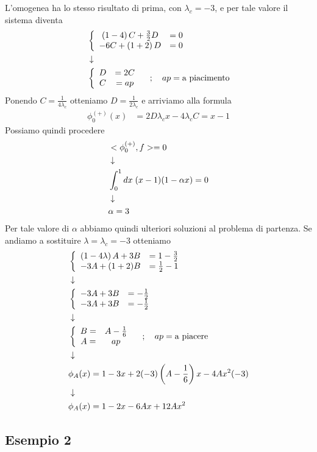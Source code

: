 \begin{enumerate}
	L'omogenea ha lo stesso risultato di prima, con $\lambda_c = -3$, e per tale valore il sistema diventa
	\begin{align}
		&\left\{ \begin{array}{cc} \left(1 -4 \right) C + \frac{3}{2} D &= 0\\ -6 C + \left( 1 +2 \right) D &=0 \end{array} \right. \\ &\downarrow \nonumber \\
		 &\left\{ \begin{array}{cc} D &= 2C\\ C &= ap \end{array} \right. \quad ; \quad ap = \text{a piacimento}
	\end{align}
	Ponendo $C = \frac{1}{4\lambda_c}$ otteniamo $D = \frac{1}{2 \lambda_c}$ e arriviamo alla formula
	\begin{align}
		\phi_0^{(+)}(x) &= 2D \lambda_c x - 4 \lambda_c C = x-1
	\end{align}
	Possiamo quindi procedere
	\begin{align}
		&<\phi_0^{(+)},f> = 0 \\ &\downarrow \nonumber \\
		&\int_{0}^{1} dx \; (x-1) (1-\alpha x) =0\nonumber \\ &\downarrow \nonumber \\
		&\alpha = 3
	\end{align}
	Per tale valore di $\alpha$ abbiamo quindi ulteriori soluzioni al problema di partenza. Se andiamo a sostituire $\lambda = \lambda_c = -3$ otteniamo
	\begin{align}
		&\left\{ \begin{array}{cc} \left(1 -4 \lambda\right) A +3B &= 1 - \frac{3}{2}\\ -3A + (1+2)B &= \frac{1}{2}-1 \end{array} \right. \\ &\downarrow \nonumber \\
		&\left\{ \begin{array}{cc} -3A +3B &= - \frac{1}{2}\\ -3A + 3B &= -\frac{1}{2} \end{array} \right. \nonumber \\ &\downarrow \nonumber \\
		&\left\{ \begin{array}{cc} B = &A - \frac{1}{6}\\ A = &ap \end{array} \right. \quad ; \quad ap= \text{a piacere} \nonumber \\ &\downarrow \nonumber \\
		&\phi_A(x) = 1 -3x +2 (-3)\left(A - \frac{1}{6}\right)x -4Ax^2(-3) \nonumber \\ &\downarrow \nonumber \\
		&\phi_A(x) = 1 -2x -6Ax +12Ax^2
	\end{align}
\end{enumerate}

\newpage

\subsection{Esempio 2}

